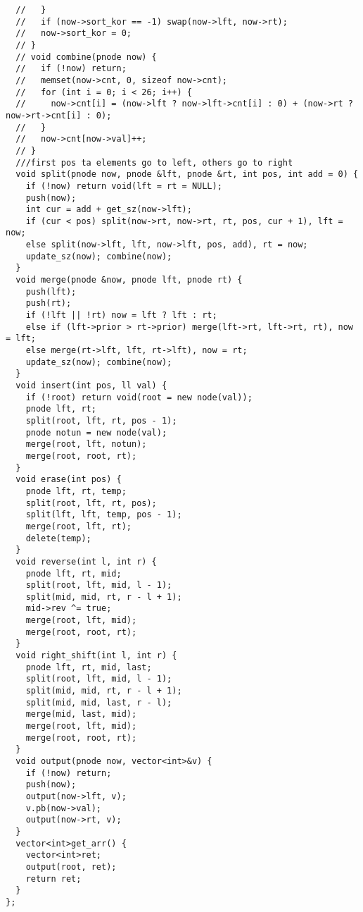\documentclass[10pt,a4paper,onesided]{article}
\begin{document}
\begin{multicols*}{3}
\begin{lstlisting}
  //   }
  //   if (now->sort_kor == -1) swap(now->lft, now->rt);
  //   now->sort_kor = 0;
  // }
  // void combine(pnode now) {
  //   if (!now) return;
  //   memset(now->cnt, 0, sizeof now->cnt);
  //   for (int i = 0; i < 26; i++) {
  //     now->cnt[i] = (now->lft ? now->lft->cnt[i] : 0) + (now->rt ? now->rt->cnt[i] : 0);
  //   }
  //   now->cnt[now->val]++;
  // }
  ///first pos ta elements go to left, others go to right
  void split(pnode now, pnode &lft, pnode &rt, int pos, int add = 0) {
    if (!now) return void(lft = rt = NULL);
    push(now);
    int cur = add + get_sz(now->lft);
    if (cur < pos) split(now->rt, now->rt, rt, pos, cur + 1), lft = now;
    else split(now->lft, lft, now->lft, pos, add), rt = now;
    update_sz(now); combine(now);
  }
  void merge(pnode &now, pnode lft, pnode rt) {
    push(lft);
    push(rt);
    if (!lft || !rt) now = lft ? lft : rt;
    else if (lft->prior > rt->prior) merge(lft->rt, lft->rt, rt), now = lft;
    else merge(rt->lft, lft, rt->lft), now = rt;
    update_sz(now); combine(now);
  }
  void insert(int pos, ll val) {
    if (!root) return void(root = new node(val));
    pnode lft, rt;
    split(root, lft, rt, pos - 1);
    pnode notun = new node(val);
    merge(root, lft, notun);
    merge(root, root, rt);
  }
  void erase(int pos) {
    pnode lft, rt, temp;
    split(root, lft, rt, pos);
    split(lft, lft, temp, pos - 1);
    merge(root, lft, rt);
    delete(temp);
  }
  void reverse(int l, int r) {
    pnode lft, rt, mid;
    split(root, lft, mid, l - 1);
    split(mid, mid, rt, r - l + 1);
    mid->rev ^= true;
    merge(root, lft, mid);
    merge(root, root, rt);
  }
  void right_shift(int l, int r) {
    pnode lft, rt, mid, last;
    split(root, lft, mid, l - 1);
    split(mid, mid, rt, r - l + 1);
    split(mid, mid, last, r - l);
    merge(mid, last, mid);
    merge(root, lft, mid);
    merge(root, root, rt);
  }
  void output(pnode now, vector<int>&v) {
    if (!now) return;
    push(now);
    output(now->lft, v);
    v.pb(now->val);
    output(now->rt, v);
  }
  vector<int>get_arr() {
    vector<int>ret;
    output(root, ret);
    return ret;
  }
};
\end{lstlisting}

\end{multicols*}
\end{document}
